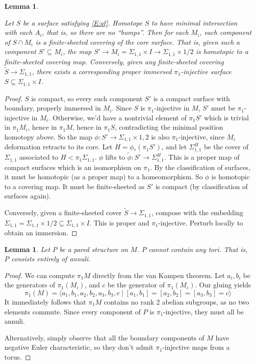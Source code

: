 \documentclass[12pt]{amsart}
\newtheorem{lemma}[theorem]{Lemma}
\theoremstyle{definition}
\theoremstyle{remark}
\newcommand{\x}{\times}
\newcommand{\Si}{\Sigma}
\newcommand{\cin}{\subseteq}
\begin{document}
\begin{lemma}\label{L:sc}

Let $S$ be a surface satisfying \eqref{E:qf}. Homotope $S$ to have minimal
intersection with each $A_i$, that is, so there are no ``bumps''.  Then for
each $M_i$, each component of $S \cap M_i$ is a finite-sheeted covering of the
core surface.  That is, given such a component $S' \cin M_i$, the map $S' \to
M_i = \Si_{1,1}\x I \to \Si_{1,1}\x{1/2}$ is homotopic to a finite-sheeted
covering map. Conversely, given any finite-sheeted covering $\widetilde{S} \to
\Si_{1,1}$, there exists a corresponding proper immersed $\pi_1$-injective
surface $S \cin \Si_{1,1}\x I$.

\end{lemma}
\begin{proof}

$S$ is compact, so every such component $S'$ is a compact surface with
boundary, properly immersed in $M_i$. Since $S$ is $\pi_1$-injective in $M$,
$S'$ must be $\pi_1$-injective in $M_i$. Otherwise, we'd have a nontrivial
element of $\pi_1S'$ which is trivial in $\pi_1M_i$, hence in $\pi_1M$, hence
in $\pi_1S$, contradicting the minimal position homotopy above. So the map
$\phi : S'\to\Si_{1,1}\x{1,2}$ is also $\pi_1$-injective, since $M_i$
deformation retracts to its core. Let $H = \phi_*(\pi_1S')$, and let
$\Si_{1,1}^H$ be the cover of $\Si_{1,1}$ associated to $H<\pi_1\Si_{1,1}$.
$\phi$ lifts to $\widetilde{\phi}\colon S'\to \Si_{1,1}^H$. This is a proper
map of compact surfaces which is an isomorphism on $\pi_1$.  By the
classification of surfaces, it must be homotopic (as a proper map) to
a homeomorphism. So $\phi$ is homotopic to a covering map. It must be
finite-sheeted as $S'$ is compact (by classification of surfaces again).

Conversely, given a finite-sheeted cover $\widetilde{S}\to \Si_{1,1}$, compose
with the embedding $\Si_{1,1} = \Si_{1,1}\x{1/2} \cin \Si_{1,1}\x I$. This is
proper and $\pi_1$-injective.  Perturb locally to obtain an immersion.

\end{proof}

\begin{lemma}

Let $P$ be a pared structure on $M$. $P$ cannot contain any tori. That is,
$P$ consists entirely of annuli.

\end{lemma}
\begin{proof}

We can compute $\pi_1M$ directly from the van Kampen theorem. Let $a_i,b_i$ be
the generators of $\pi_1(M_i)$, and $c$ be the generator of $\pi_1(M_c)$. Our
gluing yields
\[
\pi_1(M) = \langle a_1,b_1,a_2,b_2,a_3,b_3,c \mid
[a_1,b_1]=[a_2,b_2]=[a_3,b_3]=c \rangle
\]
It immediately follows that $\pi_1M$ contains no rank 2 abelian subgroups, as
no two elements commute. Since every component of $P$ is $\pi_1$-injective,
they must all be annuli.

Alternatively, simply observe that all the boundary components of $M$ have
negative Euler characteristic, so they don't admit $\pi_1$-injective maps from
a torus.

\end{proof}
\end{document}
